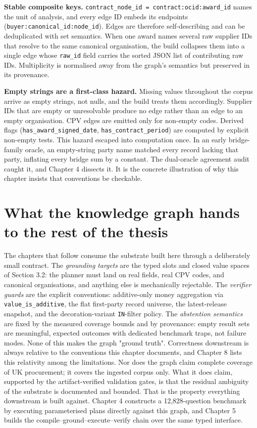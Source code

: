\textbf{Stable composite keys.} \texttt{contract\_node\_id = contract:{ocid}:{award\_id}} names the unit of analysis, and every edge ID embeds its endpoints (\texttt{buyer:{canonical\_id}:{node\_id}}). Edges are therefore self-describing and can be deduplicated with set semantics. When one award names several raw supplier IDs that resolve to the same canonical organisation, the build collapses them into a single edge whose \texttt{raw\_id} field carries the sorted JSON list of contributing raw IDs. Multiplicity is normalised away from the graph's semantics but preserved in its provenance.

\textbf{Empty strings are a first-class hazard.} Missing values throughout the corpus arrive as empty strings, not nulls, and the build treats them accordingly. Supplier IDs that are empty or unresolvable produce no edge rather than an edge to an empty organisation. CPV edges are emitted only for non-empty codes. Derived flags (\texttt{has\_award\_signed\_date}, \texttt{has\_contract\_period}) are computed by explicit non-empty tests. This hazard escaped into computation once. In an early bridge-family oracle, an empty-string party name matched every record lacking that party, inflating every bridge sum by a constant. The dual-oracle agreement audit caught it, and Chapter 4 dissects it. It is the concrete illustration of why this chapter insists that conventions be checkable.

\section{What the knowledge graph hands to the rest of the thesis}\label{sec:what-the-knowledge-graph-hands-to-the-re}

The chapters that follow consume the substrate built here through a deliberately small contract. The \emph{grounding targets} are the typed slots and closed value spaces of Section 3.2: the planner must land on real fields, real CPV codes, and canonical organisations, and anything else is mechanically rejectable. The \emph{verifier guards} are the explicit conventions: additive-only money aggregation via \texttt{value\_is\_additive}, the flat first-party record universe, the latest-release snapshot, and the decoration-variant \texttt{IN}-filter policy. The \emph{abstention semantics} are fixed by the measured coverage bounds and by provenance: empty result sets are meaningful, expected outcomes with dedicated benchmark traps, not failure modes. None of this makes the graph "ground truth". Correctness downstream is always relative to the conventions this chapter documents, and Chapter 8 lists this relativity among the limitations. Nor does the graph claim complete coverage of UK procurement; it covers the ingested corpus only. What it does claim, supported by the artifact-verified validation gates, is that the residual ambiguity of the substrate is documented and bounded. That is the property everything downstream is built against. Chapter 4 constructs a 12,828-question benchmark by executing parameterised plans directly against this graph, and Chapter 5 builds the compile--ground--execute--verify chain over the same typed interface.
